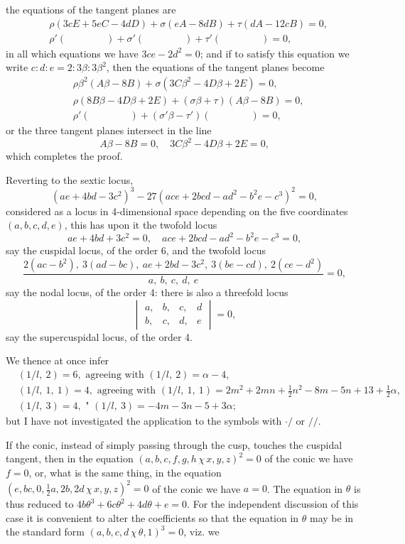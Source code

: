 \documentclass[11pt,a4paper]{article}
\theoremstyle{definition}
\begin{document}
\noindent the equations of the tangent planes are
\begin{align*}
&\rho(3cE + 5eC - 4dD) + \sigma(eA - 8dB) + \tau(dA - 12cB) = 0,\\
&\rho'(\qquad\qquad) + \sigma'(\qquad\qquad) + \tau'(\qquad\qquad) = 0,
\end{align*}
in all which equations we have $3ce - 2d^2 = 0$; and if to satisfy this equation we write $c : d : e = 2 : 3\beta : 3\beta^2$, then the equations of the tangent planes become
\begin{align*}
&\rho\beta^2(A\beta - 8B) + \sigma(3C\beta^2 - 4D\beta + 2E) = 0,\\
&\rho(8B\beta - 4D\beta + 2E) + (\sigma\beta + \tau)(A\beta - 8B) = 0,\\
&\rho'(\qquad\qquad) + (\sigma'\beta - \tau')(\qquad\qquad) = 0,
\end{align*}
or the three tangent planes intersect in the line
\[
A\beta - 8B = 0, \quad 3C\beta^2 - 4D\beta + 2E = 0,
\]
which completes the proof.

Reverting to the sextic locus,
\[
(ae + 4bd - 3c^2)^3 - 27(ace + 2bcd - ad^2 - b^2e - c^3)^2 = 0,
\]
considered as a locus in 4-dimensional space depending on the five coordinates $(a, b, c, d, e)$, this has upon it the twofold locus
\[
ae + 4bd + 3c^2 = 0, \quad ace + 2bcd - ad^2 - b^2e - c^3 = 0,
\]
say the cuspidal locus, of the order 6, and the twofold locus
\[
\frac{2(ac-b^2),\ 3(ad-bc),\ ae + 2bd - 3c^2,\ 3(be-cd),\ 2(ce-d^2)}{a,\ b,\ c,\ d,\ e} = 0,
\]
say the nodal locus, of the order 4: there is also a threefold locus
\[
\begin{vmatrix}
a, & b, & c, & d \\
b, & c, & d, & e
\end{vmatrix} = 0,
\]
say the supercuspidal locus, of the order 4.

We thence at once infer
\begin{align*}
&(1/l,\ 2) = 6, \text{ agreeing with } (1/l,\ 2) = \alpha - 4,\\
&(1/l,\ 1,\ 1) = 4, \text{ agreeing with } (1/l,\ 1,\ 1) = 2m^2 + 2mn + \tfrac{1}{2}n^2 - 8m - 5n + 13 + \tfrac{1}{2}\alpha,\\
&(1/l,\ 3) = 4, \text{ " } (1/l,\ 3) = -4m - 3n - 5 + 3\alpha;
\end{align*}
but I have not investigated the application to the symbols with $\cdot /$ or $//$.

If the conic, instead of simply passing through the cusp, touches the cuspidal tangent, then in the equation $(a, b, c, f, g, h \,\chi\, x, y, z)^2 = 0$ of the conic we have $f = 0$, or, what is the same thing, in the equation $(e, bc, 0, \tfrac{1}{2}a, 2b, 2d \,\chi\, x, y, z)^2 = 0$ of the conic we have $a = 0$. The equation in $\theta$ is thus reduced to $4b\theta^3 + 6c\theta^2 + 4d\theta + e = 0$. For the independent discussion of this case it is convenient to alter the coefficients so that the equation in $\theta$ may be in the standard form $(a, b, c, d \,\chi\, \theta, 1)^3 = 0$, viz. we
\end{document}
